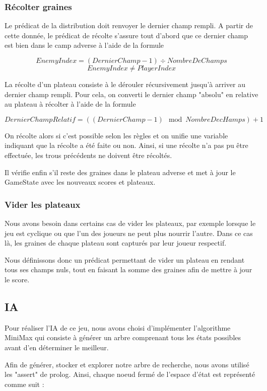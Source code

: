 \documentclass[]{article}
\begin{document}
\subsubsection{Récolter graines}

Le prédicat de la distribution doit renvoyer le dernier champ rempli. A partir de cette donnée, le prédicat de récolte s'assure tout d'abord que ce dernier champ est bien dans le camp adverse à l'aide de la formule 

$$EnemyIndex = (DernierChamp-1) \div NombreDeChamps$$
$$EnemyIndex \neq PlayerIndex$$

La récolte d'un plateau consiste à le dérouler récursivement jusqu'à arriver au dernier champ rempli. Pour cela, on converti le dernier champ "absolu" en relative au plateau à récolter à l'aide de la formule

$$DernierChampRelatif = ((DernierChamp-1) \mod NombreDecHamps) + 1$$

On récolte alors si c'est possible selon les règles et on unifie une variable indiquant que la récolte a été faite ou non. Ainsi, si une récolte n'a pas pu être effectuée, les trous précédents ne doivent être récoltés.


Il vérifie enfin s'il reste des graines dans le plateau adverse et met à jour le GameState avec les nouveaux scores et plateaux.


\subsubsection{Vider les plateaux}

Nous avons besoin dans certains cas de vider les plateaux, par exemple lorsque le jeu est cyclique ou que l'un des joueurs ne peut plus nourrir l'autre. Dans ce cas là, les graines de chaque plateau sont capturés par leur joueur respectif.

Nous définissons donc un prédicat permettant de vider un plateau en rendant tous ses champs nuls, tout en faisant la somme des graines afin de mettre à jour le score. 

\subsection{IA}

Pour réaliser l'IA de ce jeu, nous avons choisi d'implémenter l'algorithme MiniMax qui consiste à générer un arbre comprenant tous les états possibles avant d'en déterminer le meilleur. 

Afin de générer, stocker et explorer notre arbre de recherche, nous avons utilisé les "assert" de prolog. Ainsi, chaque noeud fermé de l'espace d'état est représenté comme suit :
\end{document}

